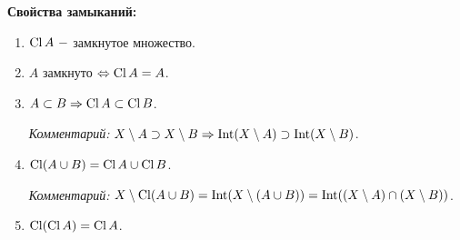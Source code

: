 \begin{statement}
    \textbf{Свойства замыканий:}
    \begin{enumerate}
        \item $\operatorname{Cl} A\ -$ замкнутое множество.
        \item $A$ замкнуто $\Leftrightarrow \operatorname{Cl} A=A$.
        \item $A\subset B\Rightarrow \operatorname{Cl} A\subset \operatorname{Cl} B$.

        \textit{Комментарий:} $X\setminus A \supset X\setminus B \Rightarrow \operatorname{Int} (X\setminus A)\supset \operatorname{Int} (X\setminus B)$.
        \item $\operatorname{Cl} (A\cup B)=\operatorname{Cl} A\cup \operatorname{Cl} B$.

        \textit{Комментарий:} $X\setminus \operatorname{Cl}(A\cup B)=\operatorname{Int} (X\setminus (A\cup B))=\operatorname{Int} ((X\setminus A)\cap (X\setminus B))$.

        \item $\operatorname{Cl} (\operatorname{Cl} A)=\operatorname{Cl} A$.
    \end{enumerate}
\end{statement}